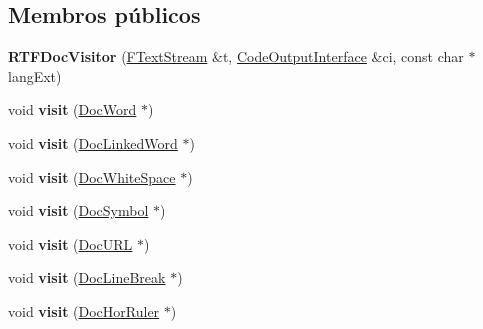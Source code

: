 \subsection*{Membros públicos}
\begin{DoxyCompactItemize}
\item 
\hypertarget{class_r_t_f_doc_visitor_ac0e43a17b982b3c56b6141b5db99df78}{{\bfseries R\-T\-F\-Doc\-Visitor} (\hyperlink{class_f_text_stream}{F\-Text\-Stream} \&t, \hyperlink{class_code_output_interface}{Code\-Output\-Interface} \&ci, const char $\ast$lang\-Ext)}\label{class_r_t_f_doc_visitor_ac0e43a17b982b3c56b6141b5db99df78}

\item 
\hypertarget{class_r_t_f_doc_visitor_ac60f6c2f041b955124e3ba6b63111ca5}{void {\bfseries visit} (\hyperlink{class_doc_word}{Doc\-Word} $\ast$)}\label{class_r_t_f_doc_visitor_ac60f6c2f041b955124e3ba6b63111ca5}

\item 
\hypertarget{class_r_t_f_doc_visitor_ab957281f81eaa9db582ac66f014ef342}{void {\bfseries visit} (\hyperlink{class_doc_linked_word}{Doc\-Linked\-Word} $\ast$)}\label{class_r_t_f_doc_visitor_ab957281f81eaa9db582ac66f014ef342}

\item 
\hypertarget{class_r_t_f_doc_visitor_a8e427da6441fcfec76f860101da1b132}{void {\bfseries visit} (\hyperlink{class_doc_white_space}{Doc\-White\-Space} $\ast$)}\label{class_r_t_f_doc_visitor_a8e427da6441fcfec76f860101da1b132}

\item 
\hypertarget{class_r_t_f_doc_visitor_aba7904fef0b15b1ff249f41815d3b739}{void {\bfseries visit} (\hyperlink{class_doc_symbol}{Doc\-Symbol} $\ast$)}\label{class_r_t_f_doc_visitor_aba7904fef0b15b1ff249f41815d3b739}

\item 
\hypertarget{class_r_t_f_doc_visitor_a38b6defe4c1e4aa2fb6bbc944f58f93c}{void {\bfseries visit} (\hyperlink{class_doc_u_r_l}{Doc\-U\-R\-L} $\ast$)}\label{class_r_t_f_doc_visitor_a38b6defe4c1e4aa2fb6bbc944f58f93c}

\item 
\hypertarget{class_r_t_f_doc_visitor_a1719b7dfc3a83b7976ff5997f56cd474}{void {\bfseries visit} (\hyperlink{class_doc_line_break}{Doc\-Line\-Break} $\ast$)}\label{class_r_t_f_doc_visitor_a1719b7dfc3a83b7976ff5997f56cd474}

\item 
\hypertarget{class_r_t_f_doc_visitor_aeed3d42f5e96c4016fbc6ab678f5549a}{void {\bfseries visit} (\hyperlink{class_doc_hor_ruler}{Doc\-Hor\-Ruler} $\ast$)}\label{class_r_t_f_doc_visitor_aeed3d42f5e96c4016fbc6ab678f5549a}


\end{DoxyCompactItemize}
